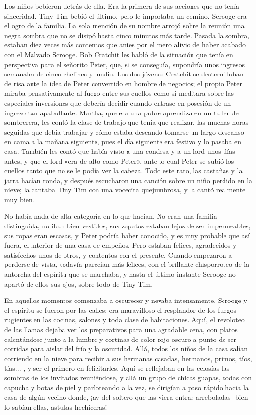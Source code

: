 \documentclass{novela}
\begin{document}
 Los niños bebieron detrás de ella. Era la primera de sus acciones que no tenía sinceridad. Tiny Tim bebió el último, pero le importaba un comino. Scrooge era el ogro de la familia. La sola mención de su nombre arrojó sobre la reunión una negra sombra que no se disipó hasta cinco minutos más tarde. Pasada la sombra, estaban diez veces más contentos que antes por el mero alivio de haber acabado con el Malvado Scrooge. Bob Cratchit les habló de la situación que tenía en perspectiva para el señorito Peter, que, si se conseguía, supondría unos ingresos semanales de cinco chelines y medio. Los dos jóvenes Cratchit se desternillaban de risa ante la idea de Peter convertido en hombre de negocios; el propio Peter miraba pensativamente al fuego entre sus cuellos como si meditara sobre las especiales inversiones que debería decidir cuando entrase en posesión de un ingreso tan apabullante. Martha, que era una pobre aprendiza en un taller de sombrerera, les contó la clase de trabajo que tenía que realizar, las muchas horas seguidas que debía trabajar y cómo estaba deseando tomarse un largo descanso en cama a la mañana siguiente, pues el día siguiente era festivo y lo pasaba en casa. También les contó que había visto a una condesa y a un lord unos días antes, y que el lord «era de alto como Peter», ante lo cual Peter se subió los cuellos tanto que no se le podía ver la cabeza. Todo este rato, las castañas y la jarra hacían ronda, y después escucharon una canción sobre un niño perdido en la nieve; la cantaba Tiny Tim con una vocecita quejumbrosa, y la cantó realmente muy bien.

 No había nada de alta categoría en lo que hacían. No eran una familia distinguida; no iban bien vestidos; sus zapatos estaban lejos de ser impermeables; sus ropas eran escasas, y Peter podría haber conocido, y es muy probable que así fuera, el interior de una casa de empeños. Pero estaban felices, agradecidos y satisfechos unos de otros, y contentos con el presente. Cuando empezaron a perderse de vista, todavía parecían más felices, con el brillante chisporroteo de la antorcha del espíritu que se marchaba, y hasta el último instante Scrooge no apartó de ellos sus ojos, sobre todo de Tiny Tim.

 En aquellos momentos comenzaba a oscurecer y nevaba intensamente. Scrooge y el espíritu se fueron por las calles; era maravilloso el resplandor de los fuegos rugientes en las cocinas, salones y toda clase de habitaciones. Aquí, el revoloteo de las llamas dejaba ver los preparativos para una agradable cena, con platos calentándose junto a la lumbre y cortinas de color rojo oscuro a punto de ser corridas para aislar del frío y la oscuridad. Allá, todos los niños de la casa salían corriendo en la nieve para recibir a sus hermanas casadas, hermanos, primos, tíos, tías... , y ser el primero en felicitarles. Aquí se reflejaban en las celosías las sombras de los invitados reuniéndose, y allá un grupo de chicas guapas, todas con capucha y botas de piel y parloteando a la vez, se dirigían a paso rápido hacia la casa de algún vecino donde, ¡ay del soltero que las viera entrar arreboladas -bien lo sabían ellas, astutas hechiceras!
\end{document}
